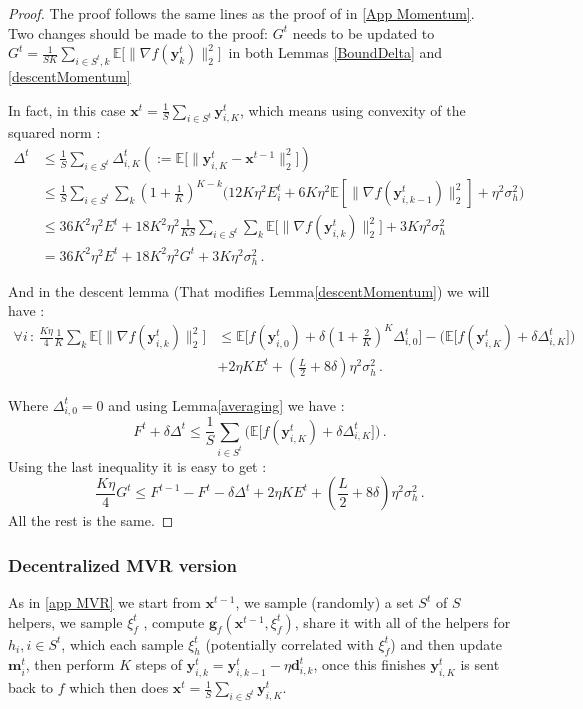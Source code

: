\documentclass[10pt]{article} %
\theoremstyle{plain}
\theoremstyle{definition}
\theoremstyle{remark}
\newcommand{\norm}[1]{\|#1\|_2}
\def\vd{{\bm{d}}}
\def\vg{{\bm{g}}}
\def\vm{{\bm{m}}}
\def\vx{{\bm{x}}}
\def\vy{{\bm{y}}}
\newcommand{\E}{\mathbb{E}}
\begin{document}
\begin{proof}
The proof follows the same lines as the proof of in \ref{App Momentum}.\\ Two changes should be made to the proof: $G^t$ needs to be updated to 
 $G^t = \frac{1}{SK}\sum_{i\in S^t,k} \E\big[\norm{\nabla f(\vy^t_k)}^2\big]\,$ in both Lemmas \ref{BoundDelta} and  \ref{descentMomentum} 

In fact, in this case $\vx^t =\frac{1}{S}\sum_{i\in S^t} \vy^t_{i,K}$, which means using convexity of the squared norm :  
\begin{align*}
    \Delta^t &\leq \frac{1}{S}\sum_{i\in S^t}\Delta^t_{i,K} (:=\E\big[\norm{\vy^t_{i,K} - \vx^{t-1}}^2\big])\\ &\leq  \frac{1}{S}\sum_{i\in S^t}\sum_k (1+\frac{1}{K})^{K-k}\Big(12 K\eta^2 E_i^t + 6K\eta^2\E[\norm{\nabla f(\vy^t_{i,k-1})}^2] + \eta^2\sigma_h^2\Big)\\
    &\leq 36 K^2\eta^2 E^t + 18 K^2\eta^2 \frac{1}{KS}\sum_{i\in S^t}\sum_k \E\big[\norm{\nabla f(\vy^t_{i,k})}^2\big] + 3K\eta^2\sigma_h^2\\&=36 K^2\eta^2 E^t + 18 K^2\eta^2 G^t+ 3K\eta^2\sigma_h^2\, .
\end{align*}

And in the descent lemma (That modifies Lemma\ref{descentMomentum}) we will have :
\begin{align*}
    \forall i \, : \,\frac{K\eta}{4}\frac{1}{K}\sum_k \E\big[\norm{\nabla f(\vy^t_{i,k})}^2\big] &\leq \E\big[f(\vy^t_{i,0}) + \delta (1 + \frac{2}{K})^{K}\Delta^t_{i,0}\big] - \Big(\E\big[f(\vy^t_{i,K}) + \delta \Delta^t_{i,K}\big]\Big) \\&+ 2 \eta K E^t + (\frac{L}{2}+ 8\delta)\eta^2\sigma_h^2\, .
\end{align*}

Where $\Delta^t_{i,0} = 0$ and using Lemma\ref{averaging} we have :
$$F^t + \delta \Delta^t \leq \frac{1}{S}\sum_{i\in S^t}\Big(\E\big[f(\vy^t_{i,K}) + \delta \Delta^t_{i,K}\big]\Big)\, .$$
Using the last inequality it is easy to get :
$$\frac{K\eta}{4}G^t \leq F^{t-1} - F^{t} - \delta \Delta^t + 2 \eta K E^t + (\frac{L}{2}+ 8\delta)\eta^2\sigma_h^2\, .$$
All the rest is the same.
\end{proof}



\subsubsection{Decentralized MVR version}
As in \ref{app MVR} we start from $\vx^{t-1}$, we sample (randomly) a set $S^t$ of $S$ helpers, we sample $\xi_f^t$ , compute $\vg_f(\vx^{t-1},\xi_f^t)$, share it with all of the helpers for $h_i, i\in S^t$, which each sample $\xi_h^t$ (potentially correlated with $\xi_f^t$) and then update $\vm^t_i$, then perform $K$ steps of $\vy^t_{i,k} = \vy^t_{i,k-1} - \eta \vd^t_{i,k}$, once this finishes $\vy^t_{i,K}$ is sent back to $f$ which then does $\vx^t = \frac{1}{S}\sum_{i\in S^t}\vy^t_{i,K}$.
\end{document}
